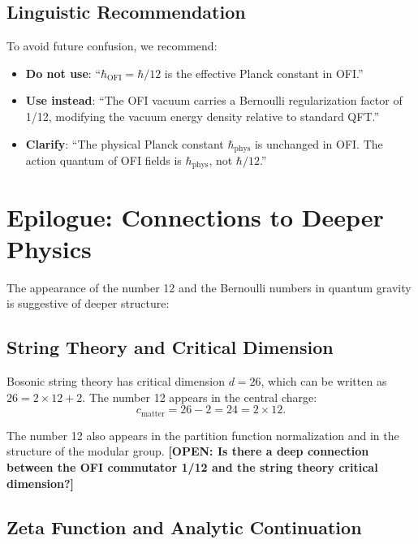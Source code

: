 \documentclass[12pt]{article}
\theoremstyle{definition}
\newcommand{\OPEN}[1]{\textcolor{opencolor}{\textbf{[OPEN: #1]}}}
\begin{document}
\subsection{Linguistic Recommendation}

To avoid future confusion, we recommend:
\begin{itemize}
  \item \textbf{Do not use}: ``$\hbar_{\mathrm{OFI}} = \hbar/12$ is the effective Planck
    constant in OFI.''

  \item \textbf{Use instead}: ``The OFI vacuum carries a Bernoulli regularization factor
    of 1/12, modifying the vacuum energy density relative to standard QFT.''

  \item \textbf{Clarify}: ``The physical Planck constant $\hbar_{\mathrm{phys}}$ is
    unchanged in OFI. The action quantum of OFI fields is $\hbar_{\mathrm{phys}}$, not
    $\hbar/12$.''
\end{itemize}

\section{Epilogue: Connections to Deeper Physics}
\label{sec:epilogue}

The appearance of the number 12 and the Bernoulli numbers in quantum gravity is
suggestive of deeper structure:

\subsection{String Theory and Critical Dimension}

Bosonic string theory has critical dimension $d = 26$, which can be written as
$26 = 2 \times 12 + 2$. The number 12 appears in the central charge:
\begin{equation}
  c_{\text{matter}} = 26 - 2 = 24 = 2 \times 12.
\end{equation}

The number 12 also appears in the partition function normalization and in the
structure of the modular group. \OPEN{Is there a deep connection between the OFI
commutator 1/12 and the string theory critical dimension?}

\subsection{Zeta Function and Analytic Continuation}
\end{document}
